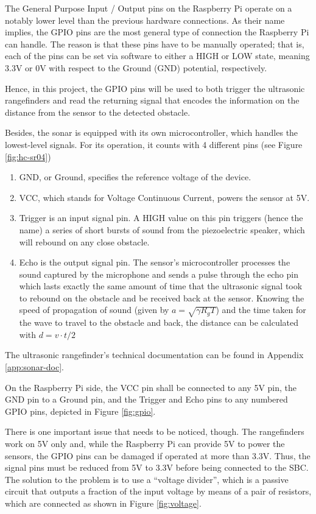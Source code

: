 The General Purpose Input / Output pins on the Raspberry Pi operate on a notably lower level than the previous hardware connections.
As their name implies, the GPIO pins are the most general type of connection the Raspberry Pi can handle.
The reason is that these pins have to be manually operated; that is, each of the pins can be set via software to either a HIGH or LOW state, meaning 3.3V or 0V with respect to the Ground (GND) potential, respectively.

Hence, in this project, the GPIO pins will be used to both trigger the ultrasonic rangefinders and read the returning signal that encodes the information on the distance from the sensor to the detected obstacle.

Besides, the sonar is equipped with its own microcontroller, which handles the lowest-level signals.
For its operation, it counts with 4 different pins (see Figure \ref{fig:hc-sr04}) 
\begin{enumerate}
	\item GND, or Ground, specifies the reference voltage of the device.
	\item VCC, which stands for Voltage Continuous Current, powers the sensor at 5V.
	\item Trigger is an input signal pin.
		A HIGH value on this pin triggers (hence the name) a series of short bursts of sound from the piezoelectric speaker, which will rebound on any close obstacle.
	\item Echo is the output signal pin.
		The sensor's microcontroller processes the sound captured by the microphone and sends a pulse through the echo pin which lasts exactly the same amount of time that the ultrasonic signal took to rebound on the obstacle and be received back at the sensor.
		Knowing the speed of propagation of sound (given by $a=\sqrt{\gamma R_g T}$) and the time taken for the wave to travel to the obstacle and back, the distance can be calculated with $d=v \cdot t/2$
\end{enumerate}
The ultrasonic rangefinder's technical documentation can be found in Appendix \ref{app:sonar-doc}.

On the Raspberry Pi side, the VCC pin shall be connected to any 5V pin, the GND pin to a Ground pin, and the Trigger and Echo pins to any numbered GPIO pins, depicted in Figure \ref{fig:gpio}.



There is one important issue that needs to be noticed, though.
The rangefinders work on 5V only and, while the Raspberry Pi can provide 5V to power the sensors, the GPIO pins can be damaged if operated at more than 3.3V.
Thus, the signal pins must be reduced from 5V to 3.3V before being connected to the SBC.
The solution to the problem is to use a ``voltage divider'', which is a passive circuit that outputs a fraction of the input voltage by means of a pair of resistors, which are connected as shown in Figure \ref{fig:voltage}.

